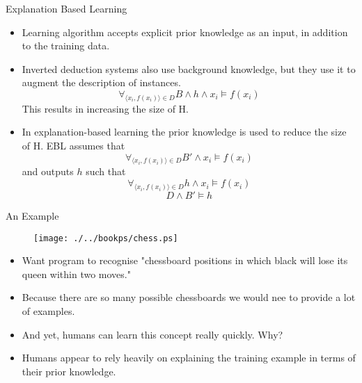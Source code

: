 \documentclass[%
pdf,
colorBG,
slideColor,
tcrico,
]{prosper}
\begin{document}
\begin{slide}{Explanation Based Learning}
\tiny
	\begin{itemize}
	 \item Learning algorithm accepts explicit prior knowledge as an input, in addition to the training data.
    	\item Inverted deduction systems also use background knowledge, but they use it to augment the description of instances. \[\forall_{\langle x_{i}, f(x_i) \rangle \in D} B \wedge h \wedge x_{i} \models f(x_{i}) \] This results in increasing the size of H.
    	\item In explanation-based learning the prior knowledge is used to reduce the size of H. EBL assumes that \[ \forall_{\langle x_{i}, f(x_i) \rangle \in D} B' \wedge x_{i} \models f(x_{i}) \] and outputs $h$ such that \[ \forall_{\langle x_{i}, f(x_i) \rangle \in D} h \wedge x_{i} \models f(x_{i}) \]\[ D \wedge B' \models h \]
	\end{itemize}

\end{slide}



\begin{slide}{An Example }
	\begin{figure}
		\centering
		\texttt{[image: ./../bookps/chess.ps]}
	\end{figure}
\tiny
	\begin{itemize}
	 \item  Want program to recognise "chessboard positions in which black will lose its queen within two moves."
    \item Because there are so many possible chessboards we would nee to provide a lot of examples.
    \item And yet, humans can learn this concept really quickly. Why?
    \item Humans appear to rely heavily on explaining the training example in terms of their prior knowledge.

	\end{itemize}

\end{slide}


\end{document}
